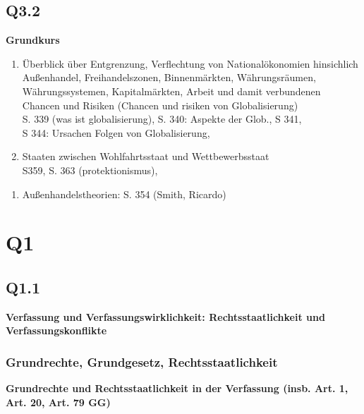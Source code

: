 \documentclass[12pt, letterpaper]{article}
\begin{document}
\subsection{Q3.2}
\label{sec:Q3.2}
\textbf{Grundkurs} 
\begin{enumerate}
  \item Überblick über Entgrenzung, Verflechtung von Nationalökonomien hinsichlich Außenhandel, Freihandelszonen, Binnenmärkten, Währungsräumen, Währungssystemen, Kapitalmärkten, Arbeit und damit verbundenen Chancen und Risiken (Chancen und risiken von Globalisierung)\\
    S. 339 (was ist globalisierung), S. 340: Aspekte der Glob., S 341, \\
    S 344: Ursachen Folgen von Globalisierung, 
  \item Staaten zwischen Wohlfahrtsstaat und Wettbewerbsstaat\\
    S359, S. 363 (protektionismus), 
\end{enumerate}
\begin{enumerate}
  \item Außenhandelstheorien: S. 354 (Smith, Ricardo)

  
\end{enumerate}


\newpage
\section{Q1}
\label{sec:Q1}
\subsection{Q1.1}
\label{sec:Q1.1}
\textbf{Verfassung und Verfassungswirklichkeit: Rechtsstaatlichkeit und Verfassungskonflikte} 


\subsubsection{Grundrechte, Grundgesetz, Rechtsstaatlichkeit}
\label{sec:Grundrechte, Grundgesetz, Rechtsstaatlichkeit}

\textbf{Grundrechte und Rechtsstaatlichkeit in der Verfassung (insb. Art. 1, Art. 20, Art. 79 GG)} 
\end{document}
